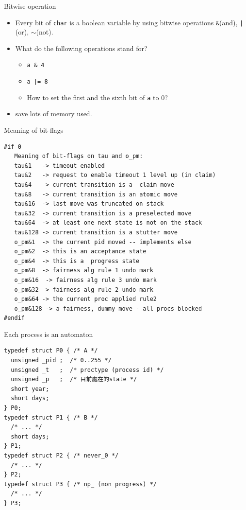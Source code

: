 \documentclass[12pt]{beamer}
\newcommand{\code}[1]{\texttt{#1}}
\begin{document}
\begin{frame}{Bitwise operation}
\begin{itemize}
	\item Every bit of \code{char} is a boolean variable by using bitwise operations \code{\&}(and), \code{|}(or), \code{$\sim$}(not).
	\item What do the following operations stand for?
	\begin{itemize}
		\item \code{a \& 4}\\	\only<2-4>{\textcolor{red}{value of the third bit is 0 or not}}
		\item \code{a |= 8}\\	\only<3-4>{\textcolor{red}{set the 4th bit to 1}}
		\item How to set the first and the sixth bit of \code{a} to 0?\\	\only<4>{\textcolor{red}{\code{a \&= $\sim$(1|32)}}}
	\end{itemize}
	\item save lots of memory used.
\end{itemize}
\end{frame}

\begin{frame}[fragile]{Meaning of bit-flags}
\begin{lstlisting}[basicstyle=\footnotesize\ttfamily]
#if 0
   Meaning of bit-flags on tau and o_pm:
   tau&1   -> timeout enabled
   tau&2   -> request to enable timeout 1 level up (in claim)
   tau&4   -> current transition is a  claim move
   tau&8   -> current transition is an atomic move
   tau&16  -> last move was truncated on stack
   tau&32  -> current transition is a preselected move
   tau&64  -> at least one next state is not on the stack
   tau&128 -> current transition is a stutter move
   o_pm&1  -> the current pid moved -- implements else
   o_pm&2  -> this is an acceptance state
   o_pm&4  -> this is a  progress state
   o_pm&8  -> fairness alg rule 1 undo mark
   o_pm&16  -> fairness alg rule 3 undo mark
   o_pm&32 -> fairness alg rule 2 undo mark
   o_pm&64 -> the current proc applied rule2
   o_pm&128 -> a fairness, dummy move - all procs blocked
#endif
\end{lstlisting}
\end{frame}

\begin{frame}[fragile]{Each process is an automaton}
\begin{lstlisting}[basicstyle=\footnotesize\ttfamily]
typedef struct P0 { /* A */
  unsigned _pid ;  /* 0..255 */
  unsigned _t   ;  /* proctype (process id) */
  unsigned _p   ;  /* 目前處在的state */
  short year;
  short days;
} P0;
typedef struct P1 { /* B */
  /* ... */
  short days;
} P1;
typedef struct P2 { /* never_0 */
  /* ... */
} P2;
typedef struct P3 { /* np_ (non progress) */
  /* ... */
} P3;
\end{lstlisting}
\end{frame}
\end{document}
